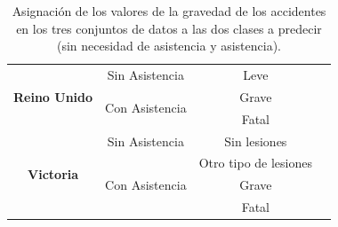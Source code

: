 \documentclass{uathesis-es}
\begin{document}
{\begin{table}[H]
\begin{center}
\begin{tabular}{|c|c||c|c|}
        \multirow{3}{*}{\textbf{Reino Unido}} &
            Sin Asistencia & Leve \\ \cline{2-3} &
            \multirow{2}{*}{Con Asistencia} & Grave \\ &
                                            & Fatal  \\ \hline
            \hline
    
        \multirow{4}{*}{\textbf{Victoria}} &
            Sin Asistencia & Sin lesiones \\ \cline{2-3} &
            \multirow{3}{*}{Con Asistencia} & Otro tipo de lesiones \\ &
                                            & Grave  \\ &
                                            & Fatal \\ \hline
            \hline
            
    	\end{tabular}
    \end{center}
	\caption{Asignación de los valores de la gravedad de los accidentes en los tres conjuntos de datos a las dos clases a predecir (sin necesidad de asistencia y asistencia).}
	\label{MAPPING_ASSISTANCE}
\end{table}



}
\end{document}
